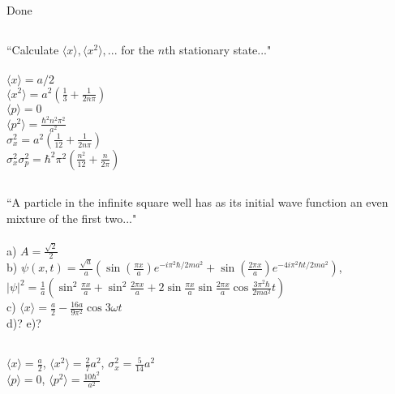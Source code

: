 \documentclass{article}
\newcommand{\<}{\langle}
\renewcommand{\>}{\rangle}
\begin{document}
\subsection{}
\subsection{}
Done
\subsection{}
``Calculate $\<x\>, \<x^2\>,...$ for the $n$th stationary state..."
\\ \\
$\<x\> = a/2$ \\
$\<x^2\> = a^2 \left( \frac{1}{3} + \frac{1}{2n\pi} \right)$ \\
$\<p\> = 0$ \\
$\<p^2\> = \frac{\hbar^2 n^2 \pi^2}{a^2} $ \\
$\sigma_x^2 = a^2 \left( \frac{1}{12} + \frac{1}{2n\pi} \right) $ \\
$\sigma_x^2 \sigma_p^2 = \hbar^2 \pi^2 \left( \frac{n^2}{12} + \frac{n}{2\pi} \right) $
\subsection{}
``A particle in the infinite square well has as its initial wave function an even mixture of the first two..."
\\ \\
a) $A = \frac{\sqrt 2}{2}$ \\
b) $\psi(x,t) = \frac{\sqrt a}{a} \left(\sin(\frac{\pi x}{a}) e^{-i\pi^2\hbar / 2ma^2} + \sin(\frac{2\pi x}{a})e^{-4i\pi^2\hbar t / 2ma^2}\right)$,
$|\psi|^2 = \frac{1}{a} \left( \sin^2\frac{\pi x}{a} + \sin^2\frac{2\pi x}{a} + 2\sin\frac{\pi x}{a}\sin\frac{2\pi x}{a}\cos\frac{3\pi^2\hbar}{2ma^2}t  \right)$ \\
c) $\<x\> = \frac{a}{2} - \frac{16a}{9\pi^2} \cos 3\omega t$ \\
d)? e)?
\subsection{}
\subsection{}
$\<x\> = \frac{a}{2}$, 
$\<x^2\> = \frac{2}{7} a^2$,
$\sigma_x^2 = \frac{5}{14} a^2$ \\
$\<p\> = 0$, 
$\<p^2\> = \frac{10 \hbar^2}{a^2}$ \\
\end{document}
